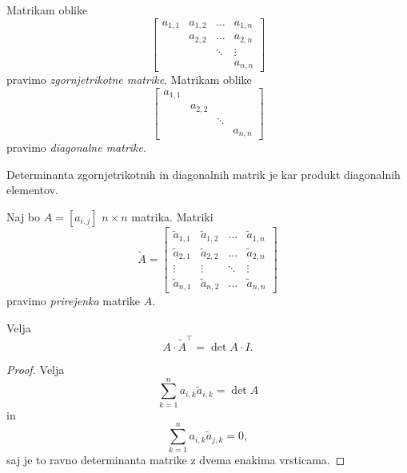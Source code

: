 \documentclass[12pt, a4paper]{article}
\begin{document}
\begin{definicija}
Matrikam oblike
\[
\begin{bmatrix}
a_{1,1} & a_{1,2} & \dots  & a_{1,n} \\ 
        & a_{2,2} & \dots  & a_{2,n} \\ 
        &         & \ddots & \vdots  \\ 
        &         &        & a_{n,n}
\end{bmatrix} 
\]
pravimo \emph{zgornjetrikotne matrike}. Matrikam oblike 
\[
\begin{bmatrix}
a_{1,1} &         &        &        \\ 
        & a_{2,2} &        &        \\ 
        &         & \ddots &        \\ 
        &         &        & a_{n,n}
\end{bmatrix} 
\]
pravimo \emph{diagonalne matrike}.
\end{definicija}

\begin{posledica}
Determinanta zgornjetrikotnih in diagonalnih matrik je kar produkt diagonalnih elementov.
\end{posledica}

\obvs

\begin{definicija}
Naj bo $A=\left[a_{i,j}\right]$ $n\times n$ matrika. Matriki
\[
\widetilde{A}=\begin{bmatrix}
\widetilde{a}_{1,1} & \widetilde{a}_{1,2} & \dots  & \widetilde{a}_{1,n} \\ 
\widetilde{a}_{2,1} & \widetilde{a}_{2,2} & \dots  & \widetilde{a}_{2,n} \\ 
\vdots              & \vdots              & \ddots & \vdots              \\ 
\widetilde{a}_{n,1} & \widetilde{a}_{n,2} & \dots  & \widetilde{a}_{n,n}
\end{bmatrix} 
\]
pravimo \emph{prirejenka} matrike $A$.
\end{definicija}

\begin{trditev}
Velja
\[
A\cdot\widetilde{A}^\top = \det A\cdot I.
\]
\end{trditev}

\begin{proof}
Velja
\[
\sum_{k=1}^n a_{i,k}\widetilde{a}_{i,k} = \det A
\]
in
\[
\sum_{k=1}^n a_{i,k}\widetilde{a}_{j,k}=0,
\]
saj je to ravno determinanta matrike z dvema enakima vrsticama.
\end{proof}
\end{document}
